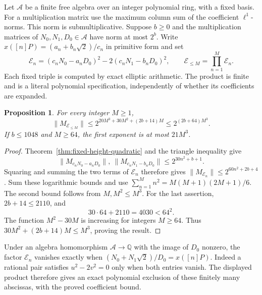 \documentclass[11pt,a4paper]{article}
\newtheorem{proposition}[theorem]{Proposition}
\begin{document}
Let $\mathcal A$ be a finite free algebra over an integer polynomial
ring, with a fixed basis. For a multiplication matrix use the maximum
column sum of the coefficient $\ell^1$-norms. This norm is
submultiplicative. Suppose $b\ge0$ and the multiplication matrices of
$N_0,N_1,D_0\in\mathcal A$ have norm at most $2^b$.
Write $x([n]P)=(a_n+b_n\sqrt2)/c_n$ in primitive form and set
\[
 \mathcal E_n=(c_nN_0-a_nD_0)^2-2(c_nN_1-b_nD_0)^2,
 \qquad \mathcal E_{\le M}=\prod_{n=1}^M\mathcal E_n.
\]
Each fixed triple is computed by exact elliptic arithmetic. The product
is finite and is a literal polynomial specification, independently of
whether its coefficients are expanded.

\begin{proposition}\label{prop:fixed-height-cubic-product}
For every integer $M\ge1$,
\[
 \|M_{\mathcal E_{\le M}}\|
       \le 2^{20M^3+30M^2+(2b+14)M}
       \le 2^{(2b+64)M^3}.
\]
If $b\le1048$ and $M\ge64$, the first exponent is at most $21M^3$.
\end{proposition}
\begin{proof}
Theorem~\ref{thm:fixed-height-quadratic} and the triangle inequality give
\[
 \|M_{c_nN_0-a_nD_0}\|,\ \|M_{c_nN_1-b_nD_0}\|
       \le2^{30n^2+b+1}.
\]
Squaring and summing the two terms of $\mathcal E_n$ therefore
gives $\|M_{\mathcal E_n}\|\le2^{60n^2+2b+4}$.
Sum these logarithmic bounds and use
$\sum_{n=1}^M n^2=M(M+1)(2M+1)/6$.
The second bound follows from $M,M^2\le M^3$.
For the last assertion, $2b+14\le2110$, and
\[
                   30\cdot64+2110=4030<64^2.
\]
The function $M^2-30M$ is increasing for integers $M\ge64$.
Thus $30M^2+(2b+14)M\le M^3$, proving the result.
\end{proof}

Under an algebra homomorphism $\mathcal A\to\mathbb Q$ with
the image of $D_0$ nonzero, the factor
$\mathcal E_n$ vanishes exactly when
$(N_0+N_1\sqrt2)/D_0=x([n]P)$. Indeed a rational pair satisfies
$u^2-2v^2=0$ only when both entries vanish. The displayed product therefore gives an exact polynomial exclusion
of these finitely many abscissas, with the proved coefficient bound.
\end{document}
